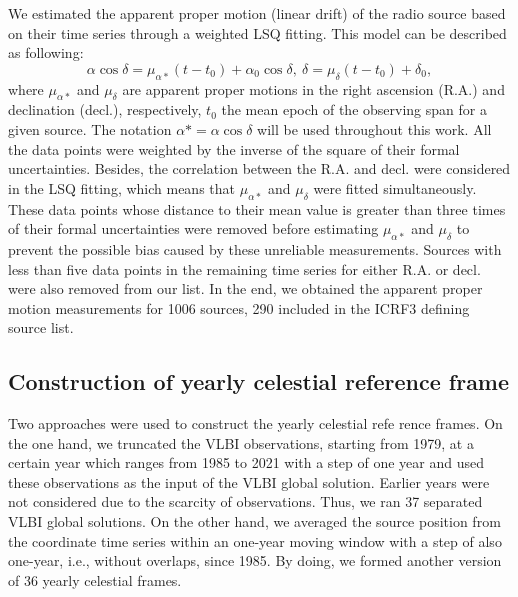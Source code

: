 \documentclass{aa}
\begin{document}
   We estimated the apparent proper motion (linear drift) of the radio source based on their time series through a weighted LSQ fitting.
   This model can be described as following:
   \begin{equation} \label{eq:apm}
      \alpha\cos\delta = \mu_{\alpha*} (t-t_0) + \alpha_0\cos\delta,\ \delta = \mu_\delta (t-t_0) + \delta_0, 
   \end{equation}
   where $\mu_{\alpha*}$ and $\mu_\delta$ are apparent proper motions in the right ascension (R.A.) and declination (decl.), respectively, $t_0$ the mean epoch of the observing span for a given source.
   The notation $\alpha*=\alpha\cos\delta$ will be used throughout this work.
   All the data points were weighted by the inverse of the square of their formal uncertainties.
   Besides, the correlation between the R.A. and decl. were considered in the LSQ fitting, which means that $\mu_{\alpha*}$ and $\mu_\delta$ were fitted simultaneously.
   These data points whose distance to their mean value is greater than three times of their formal uncertainties were removed before estimating $\mu_{\alpha*}$ and $\mu_\delta$ to prevent the possible bias caused by these unreliable measurements.
   Sources with less than five data points in the remaining time series for either R.A. or decl. were also removed from our list.
   In the end, we obtained the apparent proper motion measurements for 1006 sources, 290 included in the ICRF3 defining source list.
    

\subsection{Construction of yearly celestial reference frame}  \label{subsec:yearly-crf}

    Two approaches were used to construct the yearly celestial refe rence frames.
    On the one hand, we truncated the VLBI observations, starting from 1979, at a certain year which ranges from 1985 to 2021 with a step of one year and used these observations as the input of the VLBI global solution.
    Earlier years were not considered due to the scarcity of observations.
    Thus, we ran 37 separated VLBI global solutions.
    On the other hand, we averaged the source position from the coordinate time series within an one-year moving window with a step of also one-year, i.e., without overlaps, since 1985.
    By doing, we formed another version of 36 yearly celestial frames.
\end{document}
